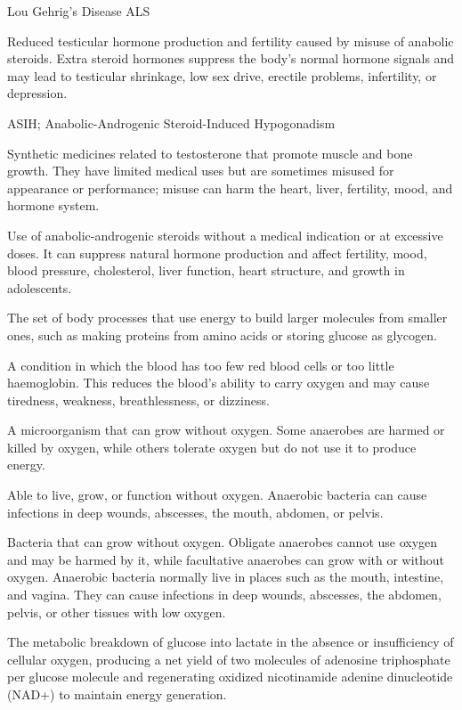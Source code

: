 \synonyms
Lou Gehrig's Disease
ALS

 Reduced testicular hormone production and fertility caused by misuse of anabolic steroids. Extra steroid hormones suppress the body’s normal hormone signals and may lead to testicular shrinkage, low sex drive, erectile problems, infertility, or depression.

\synonyms
ASIH; Anabolic-Androgenic Steroid-Induced Hypogonadism

 Synthetic medicines related to testosterone that promote muscle and bone growth. They have limited medical uses but are sometimes misused for appearance or performance; misuse can harm the heart, liver, fertility, mood, and hormone system.

 Use of anabolic-androgenic steroids without a medical indication or at excessive doses. It can suppress natural hormone production and affect fertility, mood, blood pressure, cholesterol, liver function, heart structure, and growth in adolescents.

 The set of body processes that use energy to build larger molecules from smaller ones, such as making proteins from amino acids or storing glucose as glycogen.

 A condition in which the blood has too few red blood cells or too little haemoglobin. This reduces the blood’s ability to carry oxygen and may cause tiredness, weakness, breathlessness, or dizziness.

 A microorganism that can grow without oxygen. Some anaerobes are harmed or killed by oxygen, while others tolerate oxygen but do not use it to produce energy.

 Able to live, grow, or function without oxygen. Anaerobic bacteria can cause infections in deep wounds, abscesses, the mouth, abdomen, or pelvis.

 Bacteria that can grow without oxygen. Obligate anaerobes cannot use oxygen and may be harmed by it, while facultative anaerobes can grow with or without oxygen. Anaerobic bacteria normally live in places such as the mouth, intestine, and vagina. They can cause infections in deep wounds, abscesses, the abdomen, pelvis, or other tissues with low oxygen.

 The metabolic breakdown of glucose into lactate in the absence or insufficiency of cellular oxygen, producing a net yield of two molecules of adenosine triphosphate per glucose molecule and regenerating oxidized nicotinamide adenine dinucleotide (NAD+) to maintain energy generation.

